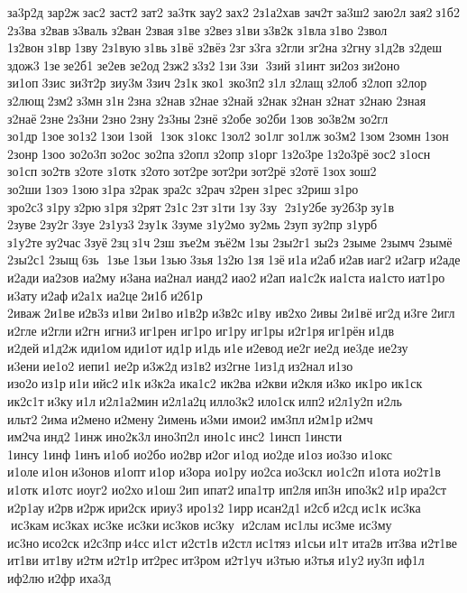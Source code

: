 за3р2д 	зар2ж зас2 	заст2 зат2 	за3тк зау2 зах2 
2з1а2хав 	зач2т за3ш2 	заю2л зая2 з1б2 	2з3ва  	з2вав з3валь 	з2ван 	2звая з1ве 	з2вез з1ви з3в2к 	з1вла з1во 	2звол 
1з2вон з1вр 1зву 
2з1вую з1вь з1вё 	з2вёз 2зг з3га 	з2гли 	зг2на 	з2гну з1д2в 	з2деш 	здож3 1зе зе2б1 	зе2ев 	зе2од 2зж2 з3з2 1зи 3зи  3зий  	з1инт 	зи2оз зи2оно 	зи1оп 3зис 
зи3т2р 	зиу3м 3зич 2з1к зко1 
зко3п2 з1л 	з2лащ 	з2лоб 	з2лоп 	з2лор 	з2лющ 2зм2 з3мн з1н 2зна  	з2нав 	з2нае 	з2най 	з2нак 	з2нан 	з2нат 	з2наю 	2зная 	з2наё 2зне 2з3ни 2зно 2зну 2з3ны 2знё 	з2обе 	зо2би 1зов 
зо3в2м 	зо2гл 	зо1др 1зое зо1з2 1зои 1зой  1зок  	з1окс 1зол2 	зо1лг 	зо1лж зо3м2 1зом  	2зомн 1зон 	2зонр 1зоо 
зо2о3п 	зо2ос 	зо2па 	з2опл 	з2опр 	з1орг 1з2о3ре 1з2о3рё зос2 	з1осн 	зо1сп 	зо2тв 	з2оте 	з1отк 	з2ото зот2ре зот2ри зот2рё 	з2отё 1зох зош2 	зо2ши 1зоэ 1зою з1ра 	з2рак 	зра2с 	з2рач 	з2рен 	з1рес 	з2риш з1ро 
зро2с3 з1ру з2рю з1ря 	з2рят 2з1с 2зт з1ти 1зу 3зу  2з1у2бе 
зу2б3р зу1в 	2зуве 2зу2г 3зуе 	2з1уз3 2зу1к 	3зуме 
з1у2мо 	зу2мь 2зуп 	зу2пр 	з1урб 
з1у2те зу2час 3зуё 2зц з1ч 2зш 	зъе2м 	зъё2м 1зы 	2зы2г1 зы2з 	2зыме 	2зымч 	2зымё 	2зы2с1 2зыщ 6зь  1зье 1зьи 1зью 3зья 1з2ю 1зя 1зё и1а и2аб и2ав иаг2 	и2агр 	и2аде 	и2ади иа2зов 	иа2му 	и3ана иа2нал 	ианд2 иао2 и2ап 
иа1с2к иа1ста иа1сто иат1ро 	и3ату и2аф и2а1х 	иа2це 2и1б и2б1р 	2иваж 2и1ве и2в3з и1ви 2и1во и1в2р и3в2с и1ву 	ив2хо 2ивы 2и1вё иг2д и3ге 2игл 	и2гле 	и2гли и2гн 	игни3 иг1рен 	иг1ро 	иг1ру 	иг1ры 
и2г1ря иг1рён и1дв 	и2дей и1д2ж иди1ом иди1от ид1р и1дь и1е и2евод ие2г ие2д 	ие3де 	ие2зу 	и3ени ие1о2 	иепи1 ие2р и3ж2д из1в2 из2гне 1из1д из2нал и1зо 	изо2о из1р и1и ийс2 и1к и3к2а 
ика1с2 	ик2ва 	и2кви 	и2кля и3ко 	ик1ро 	ик1ск 
ик2с1т и3ку и1л и2л1а2мин и2л1а2ц илло3к2 ило1ск илп2 и2л1у2п и2ль 	ильт2 2има и2мено и2мену 2имень и3ми 	имои2 	им3пл и2м1р и2мч 	им2ча инд2 1инж ино2к3л ино3п2л 	ино1с инс2 	1инсп 1инсти 	1инсу 1инф 1инъ и1об 	ио2бо 	ио2вр и2ог и1од 	ио2де и1оз 	ио3зо 	и1окс 	и1оле и1он и3онов 	и1опт и1ор 	и3ора 	ио1ру 	ио2са ио3скл 
ио1с2п 	и1ота 
ио2т1в 	и1отк 	и1отс 	иоуг2 	ио2хо и1ош 2ип 	ипат2 ипа1тр 	ип2ля ип3н 
ипо3к2 и1р ира2ст 
и2р1ау и2рв и2рж ири2ск 	ириу3 
иро1з2 1ирр исан2д1 и2сб и2сд ис1к 
ис3ка  ис3кам ис3ках 	ис3ке 	ис3ки ис3ков 
ис3ку  и2слам 	ис1лы 	ис3ме 	ис3му 	ис3но исо2ск 
и2с3пр и4сс и1ст 
и2ст1в 	и2стл ис1тяз 	и1сьи и1т 	ита2в 	ит3ва 
и2т1ве 	ит1ви 	ит1ву и2тм и2т1р ит2рес ит3ром 
и2т1уч 	и3тью 	и3тья и1у2 иу3п иф1л 	иф2лю и2фр 	иха3д 
